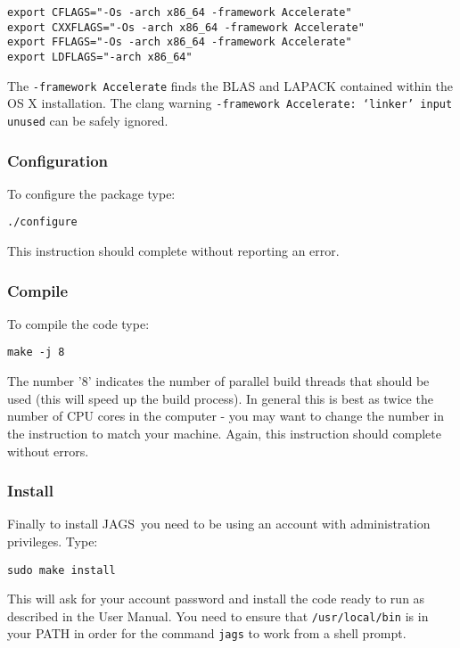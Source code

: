 \documentclass[11pt, a4paper, titlepage]{article}
\newcommand{\JAGS}{\textsf{JAGS}}
\begin{document}
\begin{verbatim}
export CFLAGS="-Os -arch x86_64 -framework Accelerate"
export CXXFLAGS="-Os -arch x86_64 -framework Accelerate"
export FFLAGS="-Os -arch x86_64 -framework Accelerate"
export LDFLAGS="-arch x86_64"
\end{verbatim}

The \texttt{-framework Accelerate} finds the BLAS and LAPACK 
contained within the OS X installation.  The clang warning
\texttt{-framework Accelerate: `linker' input unused} can
be safely ignored.

\subsubsection{Configuration}

To configure the package type:

\begin{verbatim}
./configure
\end{verbatim}

This instruction should complete without reporting an error.

\subsubsection{Compile}
\label{section:osxcompile}

To compile the code type: 

\begin{verbatim} 
make -j 8 
\end{verbatim} 

The number '8' indicates the number of parallel build threads that
should be used (this will speed up the build process).  In general this
is best as twice the number of CPU cores in the computer - you may want
to change the number in the instruction to match your machine. Again,
this instruction should complete without errors.

\subsubsection{Install}
\label{section:osxinstall}

Finally to install \JAGS\ you need to be using an account with
administration privileges.  Type: 

\begin{verbatim}
sudo make install
\end{verbatim} 

This will ask for your account password and install the code ready to 
run as described in the User Manual. You need to ensure that
\texttt{/usr/local/bin} is in your PATH in order for the command 
\texttt{jags} to work from a shell prompt.
\end{document}
